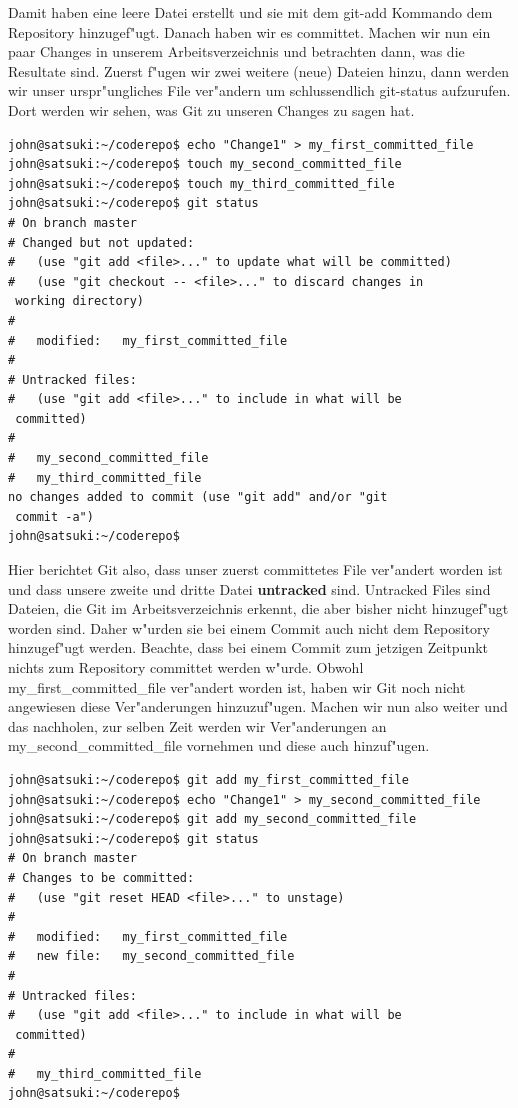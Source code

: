 Damit haben eine leere Datei erstellt und sie mit dem git-add Kommando dem Repository hinzugef"ugt. Danach haben wir es committet. Machen wir nun ein paar Changes in unserem Arbeitsverzeichnis und betrachten dann, was die Resultate sind. Zuerst f"ugen wir zwei weitere (neue) Dateien hinzu, dann werden wir unser urspr"ungliches File ver"andern um schlussendlich git-status aufzurufen. Dort werden wir sehen, was Git zu unseren Changes zu sagen hat.

\begin{Verbatim}
john@satsuki:~/coderepo$ echo "Change1" > my_first_committed_file
john@satsuki:~/coderepo$ touch my_second_committed_file
john@satsuki:~/coderepo$ touch my_third_committed_file
john@satsuki:~/coderepo$ git status
# On branch master
# Changed but not updated:
#   (use "git add <file>..." to update what will be committed)
#   (use "git checkout -- <file>..." to discard changes in 
 working directory)
#
#	modified:   my_first_committed_file
#
# Untracked files:
#   (use "git add <file>..." to include in what will be 
 committed)
#
#	my_second_committed_file
#	my_third_committed_file
no changes added to commit (use "git add" and/or "git 
 commit -a")
john@satsuki:~/coderepo$ 
\end{Verbatim} 

Hier berichtet Git also, dass unser zuerst committetes File ver"andert worden ist und dass unsere zweite und dritte Datei \textbf{untracked} sind. Untracked Files sind Dateien, die Git im Arbeitsverzeichnis erkennt, die aber bisher nicht hinzugef"ugt worden sind. Daher w"urden sie bei einem Commit auch nicht dem Repository hinzugef"ugt werden. Beachte, dass bei einem Commit zum jetzigen Zeitpunkt nichts zum Repository committet werden w"urde. Obwohl my\_first\_committed\_file ver"andert worden ist, haben wir Git noch nicht angewiesen diese Ver"anderungen hinzuzuf"ugen. Machen wir nun also weiter und das nachholen, zur selben Zeit werden wir Ver"anderungen an my\_second\_committed\_file vornehmen und diese auch hinzuf"ugen.

\begin{Verbatim}
john@satsuki:~/coderepo$ git add my_first_committed_file
john@satsuki:~/coderepo$ echo "Change1" > my_second_committed_file 
john@satsuki:~/coderepo$ git add my_second_committed_file
john@satsuki:~/coderepo$ git status
# On branch master
# Changes to be committed:
#   (use "git reset HEAD <file>..." to unstage)
#
#	modified:   my_first_committed_file
#	new file:   my_second_committed_file
#
# Untracked files:
#   (use "git add <file>..." to include in what will be 
 committed)
#
#	my_third_committed_file
john@satsuki:~/coderepo$ 
\end{Verbatim} 

